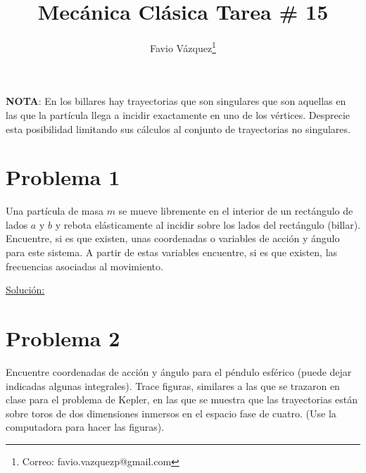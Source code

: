 \documentclass[a4paper,10pt]{article}
\title{Mecánica Clásica Tarea \# 15}
\author{Favio Vázquez\thanks{Correo: favio.vazquezp@gmail.com}}\affil{Instituto de Ciencias Nucleares. Universidad Nacional Autónoma de México.}
\date{}
\numberwithin{equation}{section}
\begin{document}
\makeatletter
\def\@maketitle{%
  \newpage
  \null
  \vskip 2em%
  \begin{center}%
  \let \footnote \thanks
    {\Large\bfseries \@title \par}%
    \vskip 1.5em%
    {\normalsize
      \lineskip .5em%
      \begin{tabular}[t]{c}%
        \@author
      \end{tabular}\par}%
    \vskip 1em%
    {\normalsize \@date}%
  \end{center}%
  \par
  \vskip 1.5em}
\makeatother

\maketitle

\textbf{NOTA}: En los billares hay trayectorias que son singulares que son aquellas
en las que la partícula llega a incidir exactamente en uno de los vértices. Desprecie 
esta posibilidad limitando sus cálculos al conjunto de trayectorias no singulares.

\vspace{.3cm}

\section{Problema 1}

Una partícula de masa $m$ se mueve libremente en el interior de un rectángulo de 
lados $a$ y $b$ y rebota elásticamente al incidir sobre los lados del rectángulo 
(billar). Encuentre, si es que existen, unas coordenadas o variables de acción 
y ángulo para este sistema. A partir de estas variables encuentre, si es que existen,
las frecuencias asociadas al movimiento. 

\vspace{.3cm}

\underline{Solución:} \vspace{.3cm}

\section{Problema 2}

Encuentre coordenadas de acción y ángulo para el péndulo esférico (puede dejar 
indicadas algunas integrales). Trace figuras, similares a las que se trazaron 
en clase para el problema de Kepler, en las que se muestra que las trayectorias 
están sobre toros de dos dimensiones inmersos en el espacio fase de cuatro. 
(Use la computadora para hacer las figuras).
\end{document}
